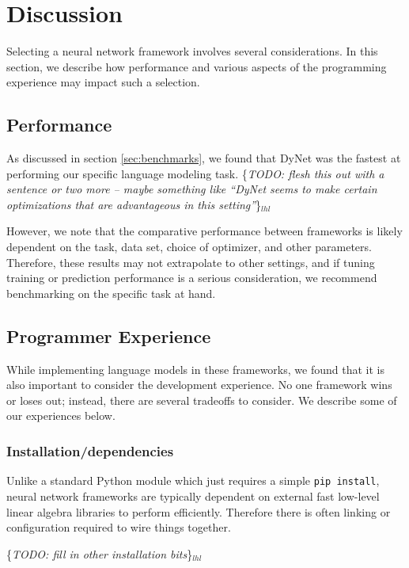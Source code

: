 \documentclass{article}
\newcommand{\lhl}[1]{{\color{magenta}\{\textit{#1}\}$_{lhl}$}}
\begin{document}
\section{Discussion}

Selecting a neural network framework involves several considerations. In this section, we describe how performance and various aspects of the programming experience may impact such a selection.

\subsection{Performance}

As discussed in section \ref{sec:benchmarks}, we found that DyNet was the fastest at performing our specific language modeling task. \lhl{TODO: flesh this out with a sentence or two more -- maybe something like ``DyNet seems to make certain optimizations that are advantageous in this setting''}

However, we note that the comparative performance between frameworks is likely dependent on the task, data set, choice of optimizer, and other parameters. Therefore, these results may not extrapolate to other settings, and if tuning training or prediction performance is a serious consideration, we recommend benchmarking on the specific task at hand.

\subsection{Programmer Experience}

While implementing language models in these frameworks, we found that it is also important to consider the development experience. No one framework wins or loses out; instead, there are several tradeoffs to consider. We describe some of our experiences below.

\subsubsection{Installation/dependencies}

Unlike a standard Python module which just requires a simple \texttt{pip install}, neural network frameworks are typically dependent on external fast low-level linear algebra libraries to perform efficiently. Therefore there is often linking or configuration required to wire things together.

\lhl{TODO: fill in other installation bits}
\end{document}

